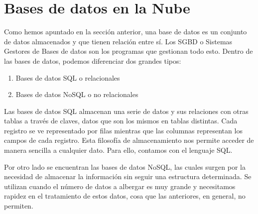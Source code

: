 \section{Bases de datos en la Nube}

	Como hemos apuntado en la sección anterior, una base de datos es un conjunto de datos almacenados y que tienen relación entre sí. Los SGBD o Sistemas Gestores de Bases de datos son los programas que gestionan todo esto. Dentro de las bases de datos, podemos diferenciar dos grandes tipos:
	
	\begin{enumerate}
		\item Bases de datos SQL o relacionales
		\item Bases de datos NoSQL o no relacionales
	\end{enumerate}
	
	Las bases de datos SQL almacenan una serie de datos y sus relaciones con otras tablas a través de claves, datos que son los mismos en tablas distintas. Cada registro se ve representado por filas mientras que las columnas representan los campos de cada registro. Esta filosofía de almacenamiento nos permite acceder de manera sencilla a cualquier dato. Para ello, contamos con el lenguaje SQL.
	
	Por otro lado se encuentran las bases de datos NoSQL, las cuales surgen por la necesidad de almacenar la información sin seguir una estructura determinada. Se utilizan cuando el número de datos a albergar es muy grande y necesitamos rapidez en el tratamiento de estos datos, cosa que las anteriores, en general, no permiten.
	